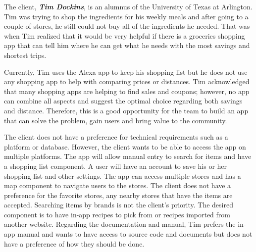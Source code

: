 The client, \textbf{\emph{Tim Dockins}}, is an alumnus of the University of Texas at Arlington. Tim was trying to shop the ingredients for his weekly meals and after going to a couple of stores, he still could not buy all of the ingredients he needed. That was when Tim realized that it would be very helpful if there is a groceries shopping app that can tell him where he can get what he needs with the most savings and shortest trips. 

Currently, Tim uses the Alexa app to keep his shopping list but he does not use any shopping app to help with comparing prices or distances. Tim acknowledged that many shopping apps are helping to find sales and coupons; however, no app can combine all aspects and suggest the optimal choice regarding both savings and distance. Therefore, this is a good opportunity for the team to build an app that can solve the problem, gain users and bring value to the community. 

The client does not have a preference for technical requirements such as a platform or database. However, the client wants to be able to access the app on multiple platforms. The app will allow manual entry to search for items and have a shopping list component. A user will have an account to save his or her shopping list and other settings. The app can access multiple stores and has a map component to navigate users to the stores. The client does not have a preference for the favorite stores, any nearby stores that have the items are accepted. Searching items by brands is not the client's priority. The desired component is to have in-app recipes to pick from or recipes imported from another website. Regarding the documentation and manual, Tim prefers the in-app manual and wants to have access to source code and documents but does not have a preference of how they should be done.
